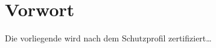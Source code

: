 \clearpage{}

\hypertarget{sec:vorwort}{\chapter*{Vorwort}
\label{sec:vorwort}}

Die vorliegende \emph{\thisproductlong{}} wird nach dem Schutzprofil \citetitle{\thispp} \citepp{} zertifiziert\dots


